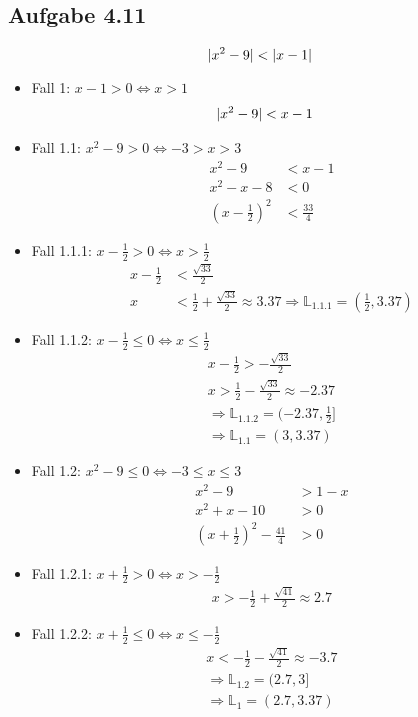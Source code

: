 \documentclass{standalone}
\begin{document}
\subsection{Aufgabe 4.11}
$$\lvert x^2 - 9\rvert < \lvert x-1\rvert$$
\begin{itemize}
    \item Fall 1: $x-1 > 0 \Leftrightarrow x > 1$\begin{align}
        \lvert x^2 - 9\rvert &< x-1 
    \end{align}
    \item Fall 1.1: $x^2-9 > 0 \Leftrightarrow -3 > x > 3$\begin{align}
        x^2 - 9 &< x - 1 \\
        x^2 - x - 8 &< 0 \\
        (x-\frac{1}{2})^2 &< \frac{33}{4}
    \end{align}
    \item Fall 1.1.1: $x-\frac{1}{2} > 0 \Leftrightarrow x > \frac{1}{2}$\begin{align}
        x-\frac{1}{2} &< \frac{\sqrt{33}}{2} \\
        x &< \frac{1}{2} + \frac{\sqrt{33}}{2} \approx 3.37
        \Rightarrow \mathbb{L}_{1.1.1} = (\frac{1}{2}, 3.37)
    \end{align}
    \item Fall 1.1.2: $x-\frac{1}{2} \leq 0 \Leftrightarrow x \leq \frac{1}{2}$\begin{align}
        x-\frac{1}{2} > -\frac{\sqrt{33}}{2} \\
        x > \frac{1}{2} - \frac{\sqrt{33}}{2} \approx -2.37 \\
        \Rightarrow \mathbb{L}_{1.1.2} = (-2.37,\frac{1}{2}] \\
        \Rightarrow \mathbb{L}_{1.1} = (3, 3.37)
    \end{align}
    \item Fall 1.2: $x^2-9 \leq 0 \Leftrightarrow -3 \leq x \leq 3$\begin{align}
        x^2 - 9 &> 1-x \\
        x^2 + x -10 &> 0 \\
        (x+\frac{1}{2})^2 -\frac{41}{4} &> 0
    \end{align}
    \item Fall 1.2.1: $x+\frac{1}{2} > 0 \Leftrightarrow x > -\frac{1}{2}$\begin{align}
        x > -\frac{1}{2}+\frac{\sqrt{41}}{2} \approx 2.7
    \end{align}
    \item Fall 1.2.2: $x+\frac{1}{2} \leq 0 \Leftrightarrow x \leq -\frac{1}{2}$\begin{align}
        x < -\frac{1}{2}-\frac{\sqrt{41}}{2} \approx -3.7 \\
        \Rightarrow \mathbb{L}_{1.2} = (2.7, 3] \\
        \Rightarrow \mathbb{L}_{1} = (2.7, 3.37)
    \end{align}


\end{itemize}
\end{document}
